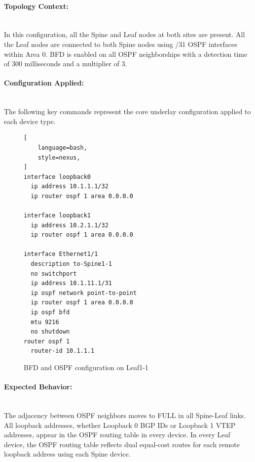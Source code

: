\paragraph{Topology Context:}~\\
In this configuration, all the Spine and Leaf nodes at both sites are present. All the Leaf nodes are connected to both Spine nodes using /31 OSPF interfaces within Area 0. BFD is enabled on all OSPF neighborships with a detection time of 300 milliseconds and a multiplier of 3.

\paragraph{Configuration Applied:}~\\
The following key commands represent the core underlay configuration applied to each device type.
\begin{figure}[!htbp]
\centering
\begin{lstlisting}[
    language=bash,
    style=nexus,
]
interface loopback0
  ip address 10.1.1.1/32
  ip router ospf 1 area 0.0.0.0

interface loopback1
  ip address 10.2.1.1/32
  ip router ospf 1 area 0.0.0.0

interface Ethernet1/1
  description to-Spine1-1
  no switchport
  ip address 10.1.11.1/31
  ip ospf network point-to-point
  ip router ospf 1 area 0.0.0.0
  ip ospf bfd
  mtu 9216
  no shutdown
router ospf 1
  router-id 10.1.1.1
\end{lstlisting}
\caption{BFD and OSPF configuration on Leaf1-1}
\label{fig:scenario1-bfd-ospf}
\end{figure}

\paragraph{Expected Behavior:}~\\
The adjacency between OSPF neighbors moves to FULL in all Spine-Leaf links. All loopback addresses, whether Loopback 0 BGP IDs or Loopback 1 VTEP addresses, appear in the OSPF routing table in every device. In every Leaf device, the OSPF routing table reflects dual equal-cost routes for each remote loopback address using each Spine device.

